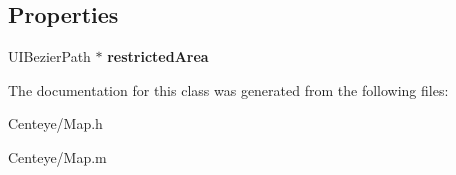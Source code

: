 \subsection*{Properties}
\begin{DoxyCompactItemize}
\item 
\hypertarget{interface_map_a8a9dedf353399bbcb9f1d0df8a639c5f}{U\+I\+Bezier\+Path $\ast$ {\bfseries restricted\+Area}}\label{interface_map_a8a9dedf353399bbcb9f1d0df8a639c5f}

\end{DoxyCompactItemize}


The documentation for this class was generated from the following files\+:\begin{DoxyCompactItemize}
\item 
Centeye/Map.\+h\item 
Centeye/Map.\+m\end{DoxyCompactItemize}
